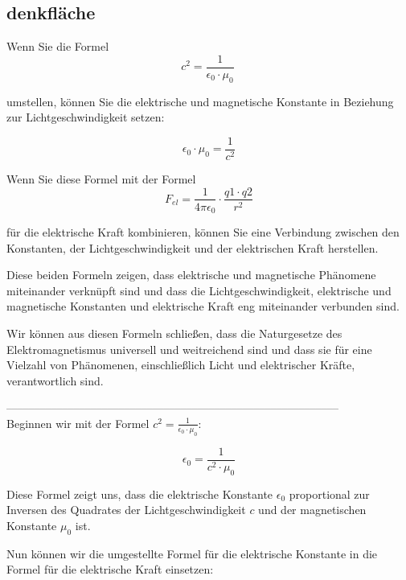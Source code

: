 \documentclass[a4paper]{report}
\begin{document}
\clearpage
\subsection{denkfläche}
Wenn Sie die Formel 
\begin{equation}
c^2 = \frac{1}{\epsilon_0 \cdot \mu_0}\
  \label{eq:wasdklfj}
\end{equation}

umstellen, können
Sie die elektrische und magnetische Konstante in Beziehung zur
Lichtgeschwindigkeit setzen:

\begin{equation}
\epsilon_0 \cdot \mu_0 = \frac{1}{c^2}
  \label{eq:weis-nicht}
\end{equation}


Wenn Sie diese Formel mit der Formel 
\begin{equation}
F_{el} = \frac{1}{4\pi \epsilon_0} \cdot \frac{q1 \cdot q2}{r^2}
\end{equation}

für die elektrische Kraft kombinieren, können Sie eine
Verbindung zwischen den Konstanten, der Lichtgeschwindigkeit und der
elektrischen Kraft herstellen.

Diese beiden Formeln zeigen, dass elektrische und magnetische Phänomene
miteinander verknüpft sind und dass die Lichtgeschwindigkeit, elektrische und
magnetische Konstanten und elektrische Kraft eng miteinander verbunden sind.

Wir können aus diesen Formeln schließen, dass die Naturgesetze des
Elektromagnetismus universell und weitreichend sind und dass sie für eine
Vielzahl von Phänomenen, einschließlich Licht und elektrischer Kräfte,
verantwortlich sind.

–––––––––––––––––––––––––––––––––––––––––––––––––––––––––––\\
Beginnen wir mit der Formel $c^2 = \frac{1}{\epsilon_0 \cdot \mu_0}$:

\begin{equation}
\epsilon_0 = \frac{1}{c^2 \cdot \mu_0}
\end{equation}


Diese Formel zeigt uns, dass die elektrische Konstante $\epsilon_0$ proportional zur
Inversen des Quadrates der Lichtgeschwindigkeit $c$ und der magnetischen
Konstante $\mu_0$ ist.

Nun können wir die umgestellte Formel für die elektrische Konstante in die
Formel für die elektrische Kraft einsetzen:
\end{document}
